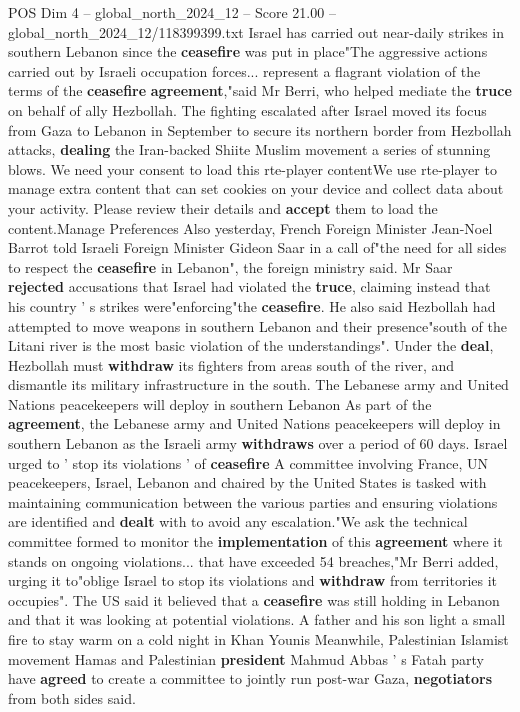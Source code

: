 \begin{textsample}{POS Dim 4 – global\_north\_2024\_12 – Score 21.00 – global\_north\_2024\_12/118399399.txt}
Israel has carried out near-daily strikes in southern Lebanon since the \textbf{ceasefire} was put in place"The aggressive actions carried out by Israeli occupation forces... represent a flagrant violation of the terms of the \textbf{ceasefire} \textbf{agreement},"said Mr Berri, who helped mediate the \textbf{truce} on behalf of ally Hezbollah.
The fighting escalated after Israel moved its focus from Gaza to Lebanon in September to secure its northern border from Hezbollah attacks, \textbf{dealing} the Iran-backed Shiite Muslim movement a series of stunning blows.
We need your consent to load this rte-player contentWe use rte-player to manage extra content that can set cookies on your device and collect data about your activity.
Please review their details and \textbf{accept} them to load the content.Manage Preferences Also yesterday, French Foreign Minister Jean-Noel Barrot told Israeli Foreign Minister Gideon Saar in a call of"the need for all sides to respect the \textbf{ceasefire} in Lebanon", the foreign ministry said.
Mr Saar \textbf{rejected} accusations that Israel had violated the \textbf{truce}, claiming instead that his country ' s strikes were"enforcing"the \textbf{ceasefire}.
He also said Hezbollah had attempted to move weapons in southern Lebanon and their presence"south of the Litani river is the most basic violation of the understandings".
Under the \textbf{deal}, Hezbollah must \textbf{withdraw} its fighters from areas south of the river, and dismantle its military infrastructure in the south.
The Lebanese army and United Nations peacekeepers will deploy in southern Lebanon As part of the \textbf{agreement}, the Lebanese army and United Nations peacekeepers will deploy in southern Lebanon as the Israeli army \textbf{withdraws} over a period of 60 days.
Israel urged to ' stop its violations ' of \textbf{ceasefire} A committee involving France, UN peacekeepers, Israel, Lebanon and chaired by the United States is tasked with maintaining communication between the various parties and ensuring violations are identified and \textbf{dealt} with to avoid any escalation."We ask the technical committee formed to monitor the \textbf{implementation} of this \textbf{agreement} where it stands on ongoing violations... that have exceeded 54 breaches,"Mr Berri added, urging it to"oblige Israel to stop its violations and \textbf{withdraw} from territories it occupies".
The US said it believed that a \textbf{ceasefire} was still holding in Lebanon and that it was looking at potential violations.
A father and his son light a small fire to stay warm on a cold night in Khan Younis Meanwhile, Palestinian Islamist movement Hamas and Palestinian \textbf{president} Mahmud Abbas ' s Fatah party have \textbf{agreed} to create a committee to jointly run post-war Gaza, \textbf{negotiators} from both sides said.

\end{textsample}
